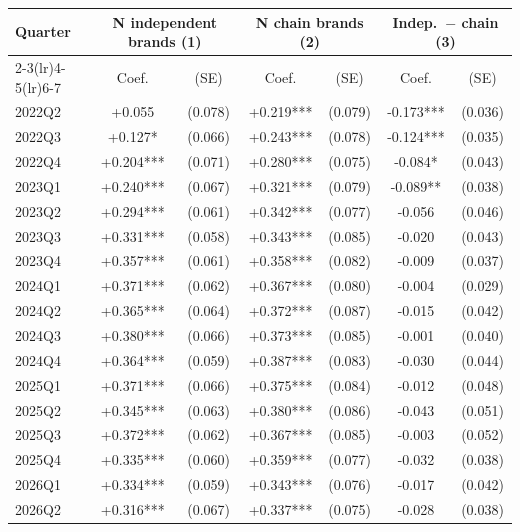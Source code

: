 \begin{tabular}{@{}lcccccc@{}}
\toprule
Quarter & \multicolumn{2}{c}{N independent brands (1)} & \multicolumn{2}{c}{N chain brands (2)} & \multicolumn{2}{c}{Indep.\ $-$ chain (3)}\\
\cmidrule(lr){2-3}\cmidrule(lr){4-5}\cmidrule(lr){6-7}
& Coef. & (SE) & Coef. & (SE) & Coef. & (SE) \\
\midrule
2022Q2 & +0.055 & (0.078) & +0.219*** & (0.079) & -0.173*** & (0.036) \\
2022Q3 & +0.127* & (0.066) & +0.243*** & (0.078) & -0.124*** & (0.035) \\
2022Q4 & +0.204*** & (0.071) & +0.280*** & (0.075) & -0.084* & (0.043) \\
2023Q1 & +0.240*** & (0.067) & +0.321*** & (0.079) & -0.089** & (0.038) \\
2023Q2 & +0.294*** & (0.061) & +0.342*** & (0.077) & -0.056 & (0.046) \\
2023Q3 & +0.331*** & (0.058) & +0.343*** & (0.085) & -0.020 & (0.043) \\
2023Q4 & +0.357*** & (0.061) & +0.358*** & (0.082) & -0.009 & (0.037) \\
2024Q1 & +0.371*** & (0.062) & +0.367*** & (0.080) & -0.004 & (0.029) \\
2024Q2 & +0.365*** & (0.064) & +0.372*** & (0.087) & -0.015 & (0.042) \\
2024Q3 & +0.380*** & (0.066) & +0.373*** & (0.085) & -0.001 & (0.040) \\
2024Q4 & +0.364*** & (0.059) & +0.387*** & (0.083) & -0.030 & (0.044) \\
2025Q1 & +0.371*** & (0.066) & +0.375*** & (0.084) & -0.012 & (0.048) \\
2025Q2 & +0.345*** & (0.063) & +0.380*** & (0.086) & -0.043 & (0.051) \\
2025Q3 & +0.372*** & (0.062) & +0.367*** & (0.085) & -0.003 & (0.052) \\
2025Q4 & +0.335*** & (0.060) & +0.359*** & (0.077) & -0.032 & (0.038) \\
2026Q1 & +0.334*** & (0.059) & +0.343*** & (0.076) & -0.017 & (0.042) \\
2026Q2 & +0.316*** & (0.067) & +0.337*** & (0.075) & -0.028 & (0.038) \\
\bottomrule
\end{tabular}

